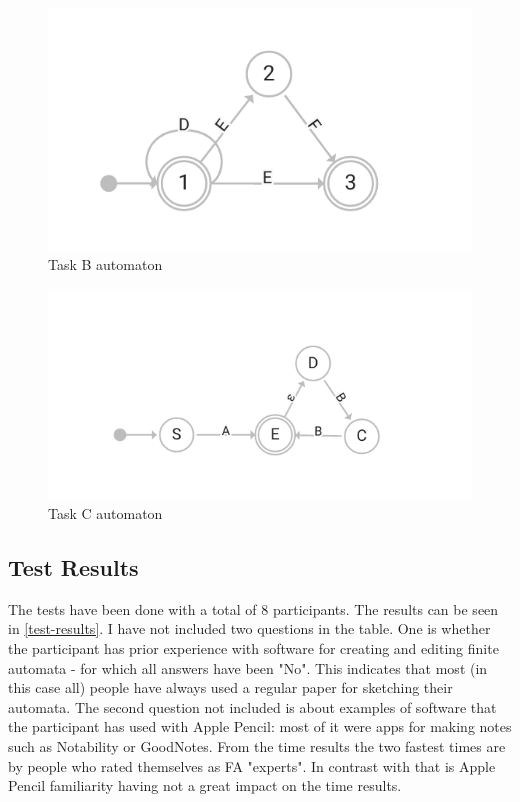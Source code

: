 \begin{figure}
    \includegraphics[width=\textwidth]{automaton_cycle}
    \caption{Task B automaton}\label{task-b-automaton}
\end{figure}

\begin{figure}
    \includegraphics[width=\textwidth]{epsilon_automaton}
    \caption{Task C automaton}\label{task-c-automaton}
\end{figure}

\subsection{Test Results}

The tests have been done with a total of 8 participants. The results can be seen in \ref{test-results}. I have not included two questions in the table. One is whether the participant has prior experience with software for creating and editing finite automata - for which all answers have been "No". This indicates that most (in this case all) people have always used a regular paper for sketching their automata. The second question not included is about examples of software that the participant has used with Apple Pencil: most of it were apps for making notes such as Notability or GoodNotes. From the time results the two fastest times are by people who rated themselves as FA "experts". In contrast with that is Apple Pencil familiarity having not a great impact on the time results. 

